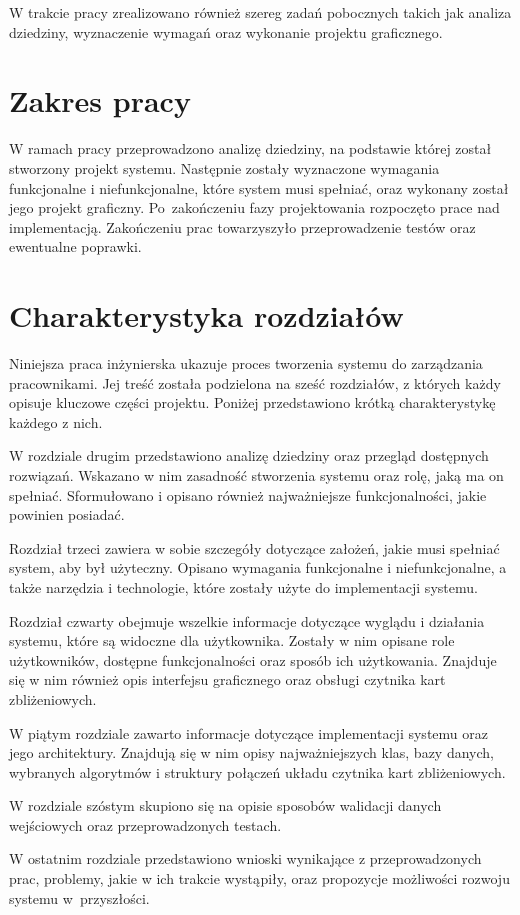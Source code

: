W trakcie pracy zrealizowano również szereg zadań pobocznych takich jak analiza dziedziny, wyznaczenie wymagań oraz wykonanie projektu graficznego.

\section{Zakres pracy}

W ramach pracy przeprowadzono analizę dziedziny, na podstawie której został stworzony projekt systemu. Następnie zostały wyznaczone wymagania funkcjonalne i niefunkcjonalne, które system musi spełniać, oraz wykonany został jego projekt graficzny. Po~zakończeniu fazy projektowania rozpoczęto prace nad implementacją. Zakończeniu prac towarzyszyło przeprowadzenie testów oraz ewentualne poprawki.

\section{Charakterystyka rozdziałów}


Niniejsza praca inżynierska ukazuje proces tworzenia systemu do zarządzania pracownikami. Jej treść została podzielona na sześć rozdziałów, z których każdy opisuje kluczowe części projektu. Poniżej przedstawiono krótką charakterystykę każdego z nich.

W rozdziale drugim przedstawiono analizę dziedziny oraz przegląd dostępnych rozwiązań. Wskazano w nim zasadność stworzenia systemu oraz rolę, jaką ma on spełniać. Sformułowano i opisano również najważniejsze funkcjonalności, jakie powinien posiadać.

Rozdział trzeci zawiera w sobie szczegóły dotyczące założeń, jakie musi spełniać system, aby był użyteczny. Opisano wymagania funkcjonalne i niefunkcjonalne, a także narzędzia i technologie, które zostały użyte do implementacji systemu.

Rozdział czwarty obejmuje wszelkie informacje dotyczące wyglądu i działania systemu, które są widoczne dla użytkownika. Zostały w nim opisane role użytkowników, dostępne funkcjonalności oraz sposób ich użytkowania. Znajduje się w nim również opis interfejsu graficznego oraz obsługi czytnika kart zbliżeniowych.

W piątym rozdziale zawarto informacje dotyczące implementacji systemu oraz jego architektury. Znajdują się w nim opisy najważniejszych klas, bazy danych, wybranych algorytmów i struktury połączeń układu czytnika kart zbliżeniowych.

W rozdziale szóstym skupiono się na opisie sposobów walidacji danych wejściowych oraz przeprowadzonych testach.

W ostatnim rozdziale przedstawiono wnioski wynikające z przeprowadzonych prac, problemy, jakie w ich trakcie wystąpiły, oraz propozycje możliwości rozwoju systemu w~przyszłości.


